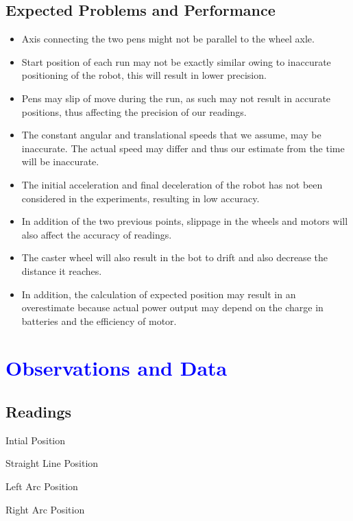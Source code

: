 \documentclass[10pt,a4paper]{article}
\begin{document}
			\subsection{Expected Problems and Performance}
				\begin{itemize}
					\item Axis connecting the two pens might not be parallel to the wheel axle.
					\item Start position of each run may not be exactly similar owing to inaccurate positioning of the robot, this will result in lower precision.
					\item Pens may slip of move during the run, as such may not result in accurate positions, thus affecting the precision of our readings.
					\item The constant angular and translational speeds that we assume, may be inaccurate. The actual speed may differ and thus our estimate from the time will be inaccurate.
					\item The initial acceleration and final deceleration of the robot has not been considered in the experiments, resulting in low accuracy.
					\item In addition of the two previous points, slippage in the wheels and motors will also affect the accuracy of readings.
					\item The caster wheel will also result in the bot to drift and also decrease the distance it reaches.
					\item In addition, the calculation of expected position may result in an overestimate because actual power output may depend on the charge in batteries and the efficiency of motor.
				\end{itemize}
			\section{\textcolor{blue}{Observations and Data}}
				\subsection{Readings}
					\begin{table}[H]
						\centering
						
						\caption{Intial Position}
					\end{table}
					\begin{table}[H]
						\centering
						
						\caption{Straight Line Position}
					\end{table}
					\begin{table}[H]
						\centering
						
						\caption{Left Arc Position}
					\end{table}
					\begin{table}[H]
						\centering
						
						\caption{Right Arc Position}
					\end{table}
\end{document}
